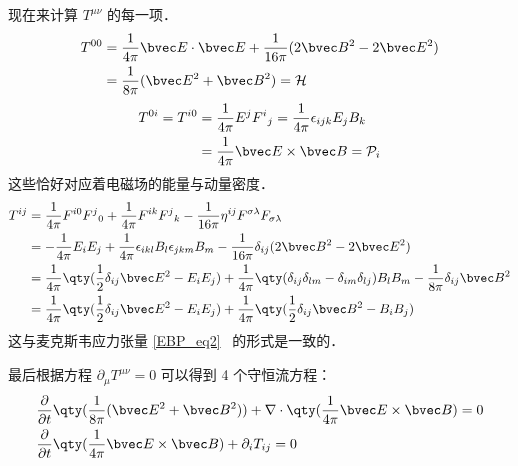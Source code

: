 现在来计算 $T^{\mu\nu}$ 的每一项．
\begin{equation}
\begin{aligned}
T^{00}&=\frac{1}{4\pi}\bvec E \cdot \bvec E+\frac{1}{16\pi}(2\bvec B^2-2\bvec E^2)\\
&=\frac{1}{8\pi}(\bvec E^2+\bvec B^2)=\mathcal{H}
\end{aligned}
\end{equation}
\begin{equation}
\begin{aligned}
T^{0i}=T^{i0}&=\frac{1}{4\pi}E^j F^i{}_j=\frac{1}{4\pi}\epsilon_{ijk}E_jB_k\\
&=\frac{1}{4\pi}\bvec E\times \bvec B=\mathcal{P}_i
\end{aligned}
\end{equation}
这些恰好对应着电磁场的能量与动量密度．
\begin{equation}
\begin{aligned}
T^{ij}&=\frac{1}{4\pi}F^{i0}F^j{}_0+\frac{1}{4\pi}F^{ik}F^j{}_k-\frac{1}{16\pi}\eta^{ij}F^{\sigma\lambda}F_{\sigma\lambda}\\
&=-\frac{1}{4\pi}E_iE_j+\frac{1}{4\pi}\epsilon_{ikl}B_l \epsilon_{jkm}B_m-\frac{1}{16\pi}\delta_{ij}(2\bvec B^2-2\bvec E^2)\\
&=\frac{1}{4\pi}\qty(\frac{1}{2}\delta_{ij}\bvec E^2-E_iE_j)+\frac{1}{4\pi}\qty(\delta_{ij}\delta_{lm}-\delta_{im}\delta_{lj})B_lB_m-\frac{1}{8\pi}\delta_{ij}\bvec B^2\\
&=\frac{1}{4\pi}\qty(\frac{1}{2}\delta_{ij}\bvec E^2-E_iE_j)+\frac{1}{4\pi}\qty(\frac{1}{2}\delta_{ij}\bvec B^2 - B_iB_j)
\end{aligned}
\end{equation}
这与麦克斯韦应力张量 \autoref{EBP_eq2}~ 的形式是一致的．

最后根据方程 $\partial_\mu T^{\mu\nu}=0$ 可以得到 4 个守恒流方程：
\begin{equation}
\begin{aligned}
&\frac{\partial }{\partial t}\qty(\frac{1}{8\pi}(\bvec E^2+\bvec B^2))+\nabla \cdot \qty(\frac{1}{4\pi}\bvec E\times \bvec B)=0\\
&\frac{\partial}{\partial t}\qty(\frac{1}{4\pi}\bvec E\times \bvec B)+\partial_i T_{ij}=0
\end{aligned}
\end{equation}

